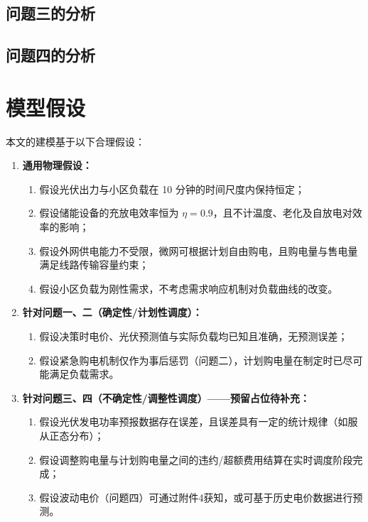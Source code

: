 \documentclass[withoutpreface,bwprint]{cumcmthesis} %
\begin{document}
\subsection{问题三的分析}
\subsection{问题四的分析}

\section{模型假设}
本文的建模基于以下合理假设：

\begin{enumerate}
    \item \textbf{通用物理假设：}
    \begin{enumerate}
        \item 假设光伏出力与小区负载在 10 分钟的时间尺度内保持恒定；
        \item 假设储能设备的充放电效率恒为 \(\eta = 0.9\)，且不计温度、老化及自放电对效率的影响；
        \item 假设外网供电能力不受限，微网可根据计划自由购电，且购电量与售电量满足线路传输容量约束；
        \item 假设小区负载为刚性需求，不考虑需求响应机制对负载曲线的改变。
    \end{enumerate}
    
    \item \textbf{针对问题一、二（确定性/计划性调度）：}
    \begin{enumerate}
        \item 假设决策时电价、光伏预测值与实际负载均已知且准确，无预测误差；
        \item 假设紧急购电机制仅作为事后惩罚（问题二），计划购电量在制定时已尽可能满足负载需求。
    \end{enumerate}

    \item \textbf{针对问题三、四（不确定性/调整性调度）——预留占位待补充：}
    \begin{enumerate}
        \item 假设光伏发电功率预报数据存在误差，且误差具有一定的统计规律（如服从正态分布）；
        \item 假设调整购电量与计划购电量之间的违约/超额费用结算在实时调度阶段完成；
        \item 假设波动电价（问题四）可通过附件4获知，或可基于历史电价数据进行预测。
    \end{enumerate}
\end{enumerate}
\end{document}
